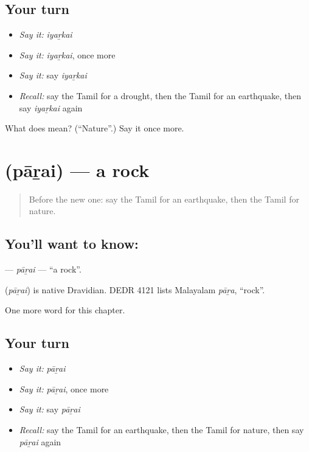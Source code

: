 \subsection*{Your turn}
\begin{itemize}
\raggedright
  \item \emph{Say it:} \emph{iyaṟkai}
  \item \emph{Say it:} \emph{iyaṟkai}, once more
  \item \emph{Say it:} say \emph{iyaṟkai}
  \item \emph{Recall:} say the Tamil for a drought, then the Tamil for an earthquake, then say \emph{iyaṟkai} again
\end{itemize}

\begin{tcolorbox}[breakable,colback=teal!4,colframe=teal!35!black,title={Before you move on}]
What does  mean? (\textquotedblleft{}Nature\textquotedblright{}.) Say it once more.
\end{tcolorbox}
\section[\texorpdfstring{\ta{பாறை} (pāṟai)}{பாறை (pāṟai)}]{ (pāṟai) — a rock}

\label{lesson:TA-C248-parai}



\begin{quote}
Before the new one: say the Tamil for an earthquake, then the Tamil for nature.
\end{quote}

\subsection*{You'll want to know: }
\textbf{} — \emph{pāṟai} — \textquotedblleft{}a rock\textquotedblright{}.

\begin{cousinweb}
\textbf{} (\emph{pāṟai}) is native Dravidian. DEDR 4121 lists Malayalam \emph{pāṟa}, \textquotedblleft{}rock\textquotedblright{}.
\end{cousinweb}

\begin{grammarlens}[title={What you've built}]
One more word for this chapter.
\end{grammarlens}

\subsection*{Your turn}
\begin{itemize}
\raggedright
  \item \emph{Say it:} \emph{pāṟai}
  \item \emph{Say it:} \emph{pāṟai}, once more
  \item \emph{Say it:} say \emph{pāṟai}
  \item \emph{Recall:} say the Tamil for an earthquake, then the Tamil for nature, then say \emph{pāṟai} again
\end{itemize}

